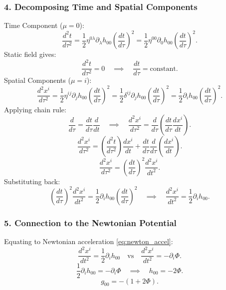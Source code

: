 \documentclass[11pt, a4paper]{report}
\begin{document}
\subsubsection*{4. Decomposing Time and Spatial Components}
Time Component ($\mu = 0$):
\begin{equation}
\frac{d^{2}t}{d\tau^{2}} = \frac{1}{2}\eta^{0\lambda}\partial_{\lambda}h_{00}\left(\frac{dt}{d\tau}\right)^{2} = \frac{1}{2}\eta^{00}\partial_{0}h_{00}\left(\frac{dt}{d\tau}\right)^{2}.
\end{equation}
Static field gives:
\begin{equation}
\frac{d^{2}t}{d\tau^{2}} = 0 \quad \implies \quad \frac{dt}{d\tau} = \text{constant}.
\end{equation}
Spatial Components ($\mu = i$):
\begin{equation}
\frac{d^{2}x^{i}}{d\tau^{2}} = \frac{1}{2}\eta^{ij}\partial_{j}h_{00}\left(\frac{dt}{d\tau}\right)^{2} = \frac{1}{2}\delta^{ij}\partial_{j}h_{00}\left(\frac{dt}{d\tau}\right)^{2} = \frac{1}{2}\partial_{i}h_{00}\left(\frac{dt}{d\tau}\right)^{2}.
\end{equation}
Applying chain rule:
\begin{equation}
\frac{d}{d\tau} = \frac{dt}{d\tau} \frac{d}{dt} \quad \implies \quad \frac{d^{2}x^{i}}{d\tau^{2}} = \frac{d}{d\tau}\left( \frac{dt}{d\tau}\frac{dx^{i}}{dt} \right).
\end{equation}
\begin{equation}
\frac{d^{2}x^{i}}{d\tau^{2}} = \left(\frac{d^{2}t}{d\tau^{2}}\right)\frac{dx^{i}}{dt} + \frac{dt}{d\tau} \frac{d}{d\tau}\left(\frac{dx^{i}}{dt}\right).
\end{equation}
\begin{equation}
\frac{d^{2}x^{i}}{d\tau^{2}} = \left(\frac{dt}{d\tau}\right)^{2} \frac{d^{2}x^{i}}{dt^{2}}.
\end{equation}
Substituting back:
\begin{equation}
\left(\frac{dt}{d\tau}\right)^{2} \frac{d^{2}x^{i}}{dt^{2}} = \frac{1}{2}\partial_{i}h_{00}\left(\frac{dt}{d\tau}\right)^{2} \quad \implies \quad \frac{d^{2}x^{i}}{dt^{2}} = \frac{1}{2}\partial_{i}h_{00}.
\end{equation}

\subsubsection*{5. Connection to the Newtonian Potential}
Equating to Newtonian acceleration \eqref{eq:newton_accel}:
\begin{equation}
\frac{d^{2}x^{i}}{dt^{2}} = \frac{1}{2}\partial_{i}h_{00} \quad \text{vs} \quad \frac{d^{2}x^{i}}{dt^{2}} = -\partial_{i}\Phi.
\end{equation}
\begin{equation}
\label{eq:h00_phi}
\frac{1}{2}\partial_{i}h_{00} = -\partial_{i}\Phi \quad \implies \quad h_{00} = -2\Phi.
\end{equation}
\begin{equation}
g_{00} = -(1 + 2\Phi).
\end{equation}
\end{document}
